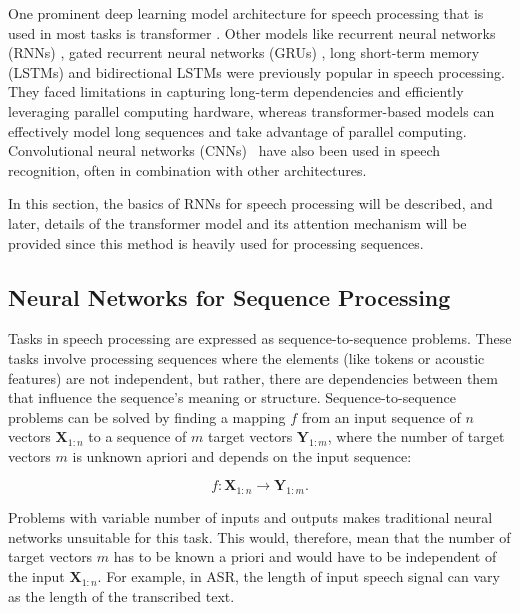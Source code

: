 One prominent deep learning model architecture for speech processing that is used in most tasks is transformer \cite{vaswani2017attention}. Other models like recurrent neural networks (RNNs) \cite{robinson1996use}, gated recurrent neural networks (GRUs) \cite{chung2014empirical}, long short-term memory (LSTMs) \cite{hochreiter1997long} and  bidirectional LSTMs \cite{huang2015bidirectional} were previously popular in speech processing. They faced limitations in capturing long-term dependencies and efficiently leveraging parallel computing hardware, whereas transformer-based models can effectively model long sequences and take advantage of parallel computing. Convolutional neural networks (CNNs)~\cite{FUKUSHIMA1988119, Krizhevsky} have also been used in speech recognition, often in combination with other architectures.

In this section, the basics of RNNs for speech processing will be described, and later, details of the transformer model and its attention mechanism will be provided since this method is heavily used for processing sequences.


\subsection{Neural Networks for Sequence Processing}\label{section:nn_seq}
Tasks in speech processing are expressed as sequence-to-sequence problems. These tasks involve processing sequences where the elements (like tokens or acoustic features) are not independent, but rather, there are dependencies between them that influence the sequence's meaning or structure. Sequence-to-sequence problems can be solved by finding a mapping $ f $ from an input sequence of $ n $ vectors $ \mathbf{X}_{1:n} $ to a sequence of $ m $ target vectors $ \mathbf{Y}_{1:m} $, where the number of target vectors $ m $ is unknown apriori and depends on the input sequence:

\begin{equation}
f : \mathbf{X}_{1:n} \rightarrow \mathbf{Y}_{1:m}.
\end{equation}

Problems with variable number of inputs and outputs makes traditional neural networks unsuitable for this task. This would, therefore, mean that the number of target vectors $ m $ has to be known a priori and would have to be independent of the input $ \mathbf{X}_{1:n} $. For example, in ASR, the length of input speech signal can vary as the length of the transcribed text.  

